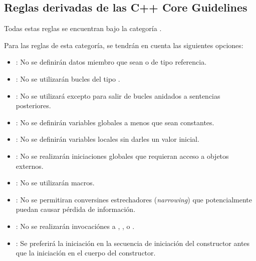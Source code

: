 \subsection{Reglas derivadas de las C++ Core Guidelines}

Todas estas reglas se encuentran bajo la categoría .

Para las reglas de esta categoría, se tendrán en cuenta las siguientes
opciones:

\begin{itemize}

\item {}:
No se definirán datos miembro que sean  o de tipo referencia.

\item {}:
No se utilizarán bucles del tipo .

\item {}:
No se utilizará  excepto para salir de bucles anidados
a sentencias posteriores.

\item {}:
No se definirán variables globales a menos que sean constantes.

\item {}:
No se definirán variables locales sin darles un valor inicial.

\item {}:
No se realizarán iniciaciones globales que requieran acceso a objetos externos.

\item {}:
No se utilizarán macros.

\item {}:
No se permitiran conversines estrechadores (\emph{narrowing}) que 
potencialmente puedan causar pérdida de información.

\item {}:
No se realizarán invocaciónes a
, ,  o .

\item {}:
Se preferirá la iniciación en la secuencia de iniciación del constructor
antes que la iniciación en el cuerpo del constructor.

\end{itemize}

